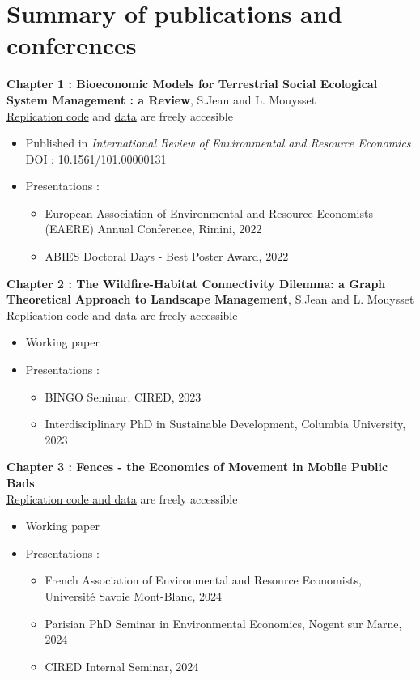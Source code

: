 \section*{Summary of publications and conferences}
\singlespacing
\textbf{Chapter 1 :  Bioeconomic Models for Terrestrial Social Ecological System Management : a Review}, S.Jean and L. Mouysset\\
\href{https://github.com/sim-jean/review-irere}{Replication code} and \href{https://zenodo.org/records/6656433}{data} are freely accesible
\begin{itemize}
\item Published in \textit{International Review of Environmental and Resource Economics}\\
 DOI : 10.1561/101.00000131
\item Presentations : 
\begin{itemize}
\item European Association of Environmental and Resource Economists (EAERE) Annual Conference, Rimini, 2022
\item ABIES Doctoral Days - Best Poster Award, 2022
\end{itemize}
\end{itemize}
%
\textbf{Chapter 2 : The Wildfire-Habitat Connectivity Dilemma: a Graph Theoretical Approach to Landscape Management}, S.Jean and L. Mouysset\\
\href{https://github.com/sim-jean/Landscape_connectivity_dilemma}{Replication code and data} are freely accessible
%
\begin{itemize}
\item Working paper
\item Presentations : 
\begin{itemize}
\item BINGO Seminar, CIRED, 2023
\item Interdisciplinary PhD in Sustainable Development, Columbia University, 2023
\end{itemize}
\end{itemize}
%
\textbf{Chapter 3 : Fences - the Economics of Movement in Mobile Public Bads}\\
\href{https://github.com/sim-jean/fences}{Replication code and data} are freely accessible
%
\begin{itemize}
\item Working paper
\item Presentations : 
\begin{itemize}
\item French Association of Environmental and Resource Economists, Université Savoie Mont-Blanc, 2024
\item Parisian PhD Seminar in Environmental Economics, Nogent sur Marne, 2024
\item CIRED Internal Seminar, 2024
\end{itemize}
\end{itemize}
